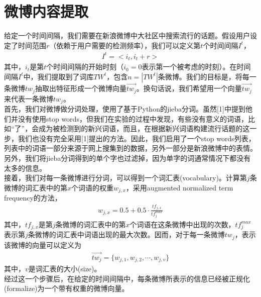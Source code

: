 \documentclass[a4paper]{article}
\begin{document}
\section{微博内容提取}
给定一个时间间隔，我们需要在新浪微博中大社区中搜索流行的话题。假设用户设定了时间范围$r$（依赖于用户需要的检测频率），我们可以定义第$t$个时间间隔$I^t$，
\begin{align}
    I^t=<i_t,i_t+r>
\end{align}
其中，$i_t$是第$t$个时间间隔的开始时刻（$i_0=0$表示第一个被考虑的时刻）。在时间间隔$I^t$中，我们提取到了词库$TW^t$，包含$n=|TW^t|$条微博。我们的目标是，将每一条微博$tw_j$抽取出特征形成一个微博向量$\vec{tw_j}$。换句话说，我们希望用一个向量$\vec{tw_j}$来代表一条微博$tw_j$。\\
\indent 首先，我们对微博做分词处理，使用了基于Python的jieba分词。虽然[1]中提到他们并没有使用stop words，但我们在实验的过程中发现，有些没有意义的词语，比如“了”，会成为被检测到的新兴词语，而且，在根据新兴词语构建流行话题的这一步，我们也没有完全采用[1]提出的方法。因此，我们启用了一个stop words列表，列表中的词语一部分来源于网上搜集到的数据，另外一部分是新浪微博中的表情。另外，我们将jieba分词得到的单个字也过滤掉，因为单字的词通常情况下都没有太多的信息。\\
\indent 接着，我们对每一条微博进行分词，可以得到一个词汇表(vocabulary)。计算第$j$条微博的词汇表中的第$x$个词语的权重$w_{j,x}$，采用augmented normalized term frequency的方法，
\begin{align}
    w_{j,x}=0.5+0.5 \cdot \frac{tf_{j,x}} {tf_{j}^{max}}
\end{align}
其中，$tf_{j,x}$是第$j$条微博的词汇表中的第$x$个词语在这条微博中出现的次数，$tf_{j}^{max}$表示第$j$条微博的词汇表中词语出现的最大次数。因而，对于每一条微博$tw_j$，表示该微博的向量可以定义为
\begin{align}
    \vec{tw_j}=\{w_{j,1}, w_{j,2}, \cdots, w_{j,v}\}
\end{align}
其中，$v$是词汇表的大小(size)。\\
\indent 经过这一个步骤后，在给定的时间间隔中，每条微博所表示的信息已经被正规化(formalize)为一个带有权重的微博向量。
\end{document}
